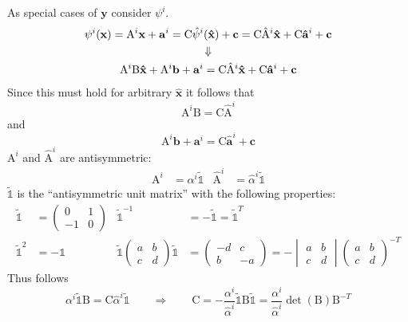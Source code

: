 \documentclass{scrartcl}
\begin{document}
As special cases of $\mathbf y$ consider $\psi^i$.
\begin{gather}
  \psi^i(\mathbf x)=\mathrm A^i\mathbf x+\mathbf a^i
  =\mathrm C\hat\psi^i(\mathbf{\hat x})+\mathbf c
  =\mathrm C\mathrm{\hat A}^i\mathbf{\hat x}
      +\mathrm C\mathbf{\hat a}^i+\mathbf c\\
  \Downarrow\notag\\
  \mathrm A^i\mathrm B\mathbf{\hat x}+\mathrm A^i\mathbf b
      +\mathbf a^i
  =\mathrm C\mathrm{\hat A}^i\mathbf{\hat x}
      +\mathrm C\mathbf{\hat a}^i+\mathbf c
\end{gather}
Since this must hold for arbitrary $\mathbf{\hat x}$ it follows that
\begin{equation}
    \mathrm A^i\mathrm B=\mathrm C\mathrm{\hat A}^i
\end{equation}
and
\begin{equation}
  \mathrm A^i\mathbf b+\mathbf a^i=\mathrm C\mathbf{\hat a}^i+\mathbf c
\end{equation}
$\mathrm A^i$ and $\mathrm{\hat A}^i$ are antisymmetric:
\begin{align}
  \mathrm A^i&=\alpha^i\mathds{\tilde1}
  &\mathrm{\hat A}^i&=\hat\alpha^i\mathds{\tilde1}
\end{align}
$\mathds{\tilde1}$ is the ``antisymmetric unit matrix'' with the following
properties:
\begin{align}
  \mathds{\tilde1}&=\begin{pmatrix}0&1\\-1&0\end{pmatrix}     &
  \mathds{\tilde1}^{-1}&=-\mathds{\tilde1}=\mathds{\tilde1}^T  \\
  \mathds{\tilde1}^2&=-\mathds1                               &
  \mathds{\tilde1}\begin{pmatrix}a&b\\c&d\end{pmatrix}\mathds{\tilde1}
      &=\begin{pmatrix}-d&c\\b&-a\end{pmatrix}
       =-\begin{vmatrix}a&b\\c&d\end{vmatrix}
         \begin{pmatrix}a&b\\c&d\end{pmatrix}^{-T}
\end{align}
Thus follows
\begin{equation}
  \alpha^i\mathds{\tilde1}\mathrm B=\mathrm C\hat\alpha^i\mathds{\tilde1}
  \qquad\Longrightarrow\qquad
  \mathrm C=-\frac{\alpha^i}{\hat\alpha^i}\mathds{\tilde1}\mathrm
  B\mathds{\tilde1}
    =\frac{\alpha^i}{\hat\alpha^i}\det(\mathrm B)\mathrm B^{-T}
\end{equation}
\end{document}
